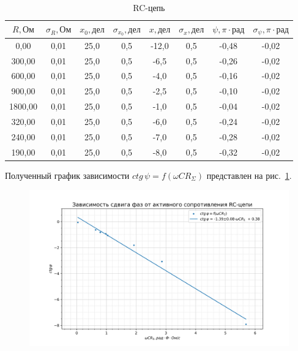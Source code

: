 \documentclass[a4paper, 12pt]{article}
\begin{document}
\begin{table}[h!]
\begin{center}
\begin{tabular}{|c|c|c|c|c|c|c|c|}
\hline
$R, Ом$   & $\sigma_R, Ом$ & $x_0, дел$ & $\sigma_{x_0}, дел$ & $x, дел$ & $\sigma_x, дел$ & $\psi, \pi \cdot рад$ & $\sigma_{\psi}, \pi \cdot рад$ \\ \hline
0,00    & 0,01   & 25,0    & 0,5      & -12,0  & 0,5     & -0,48       & -0,02        \\ \hline
300,00  & 0,01   & 25,0    & 0,5      & -6,5   & 0,5     & -0,26       & -0,02        \\ \hline
600,00  & 0,01   & 25,0    & 0,5      & -4,0   & 0,5     & -0,16       & -0,02        \\ \hline
900,00  & 0,01   & 25,0    & 0,5      & -2,5   & 0,5     & -0,10       & -0,02        \\ \hline
1800,00 & 0,01   & 25,0    & 0,5      & -1,0   & 0,5     & -0,04       & -0,02        \\ \hline
320,00  & 0,01   & 25,0    & 0,5      & -6,0   & 0,5     & -0,24       & -0,02        \\ \hline
240,00  & 0,01   & 25,0    & 0,5      & -7,0   & 0,5     & -0,28       & -0,02        \\ \hline
190,00  & 0,01   & 25,0    & 0,5      & -8,0   & 0,5     & -0,32       & -0,02        \\ \hline
\end{tabular}
\end{center}
\caption{RC-цепь}
\label{tab1}
\end{table}

Полученный график зависимости $ctg\,\psi = f(\omega CR_{\Sigma})$ представлен на рис.~\ref{ris1}.

\begin{figure}[h!]
\begin{flushleft}
    \includegraphics[scale=0.7]{3.2.1_1.png}
\end{flushleft}
\caption{}
\label{ris1}
\end{figure}
\end{document}
